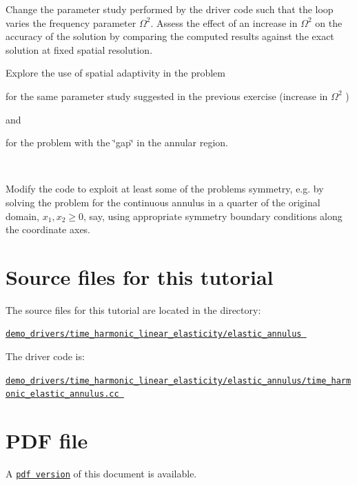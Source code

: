 \begin{DoxyItemize}
\item Change the parameter study performed by the driver code such that the loop varies the frequency parameter $ \Omega^2 $. Assess the effect of an increase in $ \Omega^2 $ on the accuracy of the solution by comparing the computed results against the exact solution at fixed spatial resolution. ~\newline
~\newline

\item Explore the use of spatial adaptivity in the problem ~\newline
~\newline

\begin{DoxyItemize}
\item for the same parameter study suggested in the previous exercise (increase in $ \Omega^2 $ )
\end{DoxyItemize}and
\begin{DoxyItemize}
\item for the problem with the \char`\"{}gap\char`\"{} in the annular region.
\end{DoxyItemize}~\newline
~\newline

\item Modify the code to exploit at least some of the problem\textquotesingle{}s symmetry, e.\+g. by solving the problem for the continuous annulus in a quarter of the original domain, $ x_1, x_2 \ge 0 $, say, using appropriate symmetry boundary conditions along the coordinate axes.
\end{DoxyItemize}

 

\hypertarget{index_sources}{}\section{Source files for this tutorial}\label{index_sources}

\begin{DoxyItemize}
\item The source files for this tutorial are located in the directory\+: \begin{center} \href{../../../../demo_drivers/time_harmonic_linear_elasticity/elastic_annulus/}{\tt demo\+\_\+drivers/time\+\_\+harmonic\+\_\+linear\+\_\+elasticity/elastic\+\_\+annulus } \end{center} 
\item The driver code is\+: \begin{center} \href{../../../../demo_drivers/time_harmonic_linear_elasticity/elastic_annulus/time_harmonic_elastic_annulus.cc}{\tt demo\+\_\+drivers/time\+\_\+harmonic\+\_\+linear\+\_\+elasticity/elastic\+\_\+annulus/time\+\_\+harmonic\+\_\+elastic\+\_\+annulus.\+cc } \end{center} 
\end{DoxyItemize}



 

 \hypertarget{index_pdf}{}\section{P\+D\+F file}\label{index_pdf}
A \href{../latex/refman.pdf}{\tt pdf version} of this document is available. 
